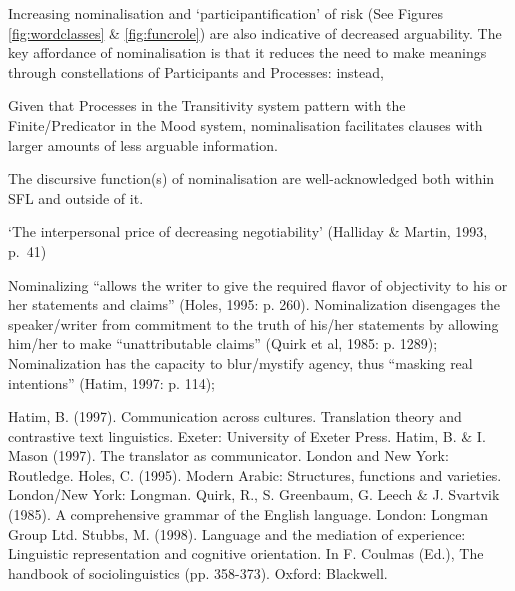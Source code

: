             Increasing nominalisation and `participantification' of risk (See Figures \ref{fig:wordclasses} \& \ref{fig:funcrole}) are also indicative of decreased arguability. The key affordance of nominalisation is that it reduces the need to make meanings through constellations of Participants and Processes: instead, 



            

            Given that Processes in the Transitivity system pattern with the Finite\slash Predicator in the Mood system, nominalisation facilitates clauses with larger amounts of less arguable information.

            The discursive function(s) of nominalisation are well-acknowledged both within SFL and outside of it.

            `The interpersonal price of decreasing negotiability' (Halliday \& Martin, 1993, p.~41)

            Nominalizing “allows the writer to give the required flavor of objectivity to his or her statements and claims” (Holes, 1995: p. 260). 
            Nominalization disengages the speaker/writer from commitment to the truth of his/her statements by allowing him/her to make “unattributable claims” (Quirk et al, 1985: p. 1289);
            Nominalization has the capacity to blur/mystify agency, thus “masking real intentions” (Hatim, 1997: p. 114);

            Hatim, B. (1997). Communication across cultures. Translation theory and contrastive text linguistics. Exeter: University of Exeter Press.
            Hatim, B.  & I. Mason (1997). The translator as communicator. London and New York: Routledge.
            Holes, C. (1995). Modern Arabic: Structures, functions and varieties. London/New York: Longman.
            Quirk, R., S. Greenbaum, G. Leech & J. Svartvik (1985). A comprehensive grammar of the English language. London: Longman Group Ltd. 
            Stubbs, M. (1998). Language and the mediation of experience: Linguistic representation and cognitive orientation. In F. Coulmas (Ed.), The handbook of sociolinguistics (pp. 358-373). Oxford: Blackwell. 







